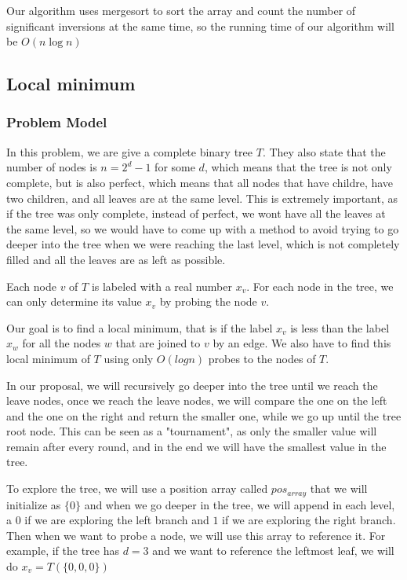 \documentclass{article}
\begin{document}
Our algorithm uses mergesort to sort the array and count the number of significant inversions at the same time, so the running time of our algorithm will be $O(n\log n)$

\subsection*{Local minimum}

\subsubsection*{Problem Model}

In this problem, we are give a complete binary tree $T$. They also state that the number of nodes is $n = 2^d -1$ for some $d$, which means that the tree is not only complete, but is also perfect, which means that all nodes that have childre, have two children, and all leaves are at the same level. This is extremely important, as if the tree was only complete, instead of perfect, we wont have all the leaves at the same level, so we would have to come up with a method to avoid trying to go deeper into the tree when we were reaching the last level, which is not completely filled and all the leaves are as left as possible.


Each node $v$ of $T$ is labeled with a real number $x_v$. For each node in the tree, we can only determine its value $x_v$ by probing the node $v$.

Our goal is to find a local minimum, that is if the label $x_v$ is less than the label $x_w$ for all the nodes $w$ that are joined to $v$ by an edge.  We also have to find this local minimum of $T$ using only $O(log n)$ probes to the nodes of $T$.

In our proposal, we will recursively go deeper into the tree until we reach the leave nodes, once we reach the leave nodes, we will compare the one on the left and the one on the right and return the smaller one, while we go up until the tree root node. This can be seen as a "tournament", as only the smaller value will remain after every round, and in the end we will have the smallest value in the tree.

To explore the tree, we will use a position array called $pos_{array}$ that we will initialize as $\{0\}$ and when we go deeper in the tree, we will append in each level, a $0$ if we are exploring the left branch and $1$ if we are exploring the right branch. Then when we want to probe a node, we will use this array to reference it. For example, if the tree has $d = 3$ and we want to reference the leftmost leaf, we will do $x_{v} = T(\{0,0,0\})$
\end{document}
